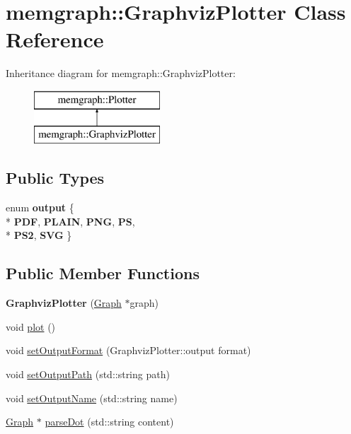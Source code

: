 \hypertarget{classmemgraph_1_1_graphviz_plotter}{}\section{memgraph\+:\+:Graphviz\+Plotter Class Reference}
\label{classmemgraph_1_1_graphviz_plotter}
Inheritance diagram for memgraph\+:\+:Graphviz\+Plotter\+:\begin{figure}[H]
\begin{center}
\leavevmode
\includegraphics[height=2.000000cm]{classmemgraph_1_1_graphviz_plotter}
\end{center}
\end{figure}
\subsection*{Public Types}
\begin{DoxyCompactItemize}
\item 
enum {\bfseries output} \{ \\*
{\bfseries P\+DF}, 
{\bfseries P\+L\+A\+IN}, 
{\bfseries P\+NG}, 
{\bfseries PS}, 
\\*
{\bfseries P\+S2}, 
{\bfseries S\+VG}
 \}\hypertarget{classmemgraph_1_1_graphviz_plotter_a0f8c41a31ef9efc836725e15a516db6e}{}\label{classmemgraph_1_1_graphviz_plotter_a0f8c41a31ef9efc836725e15a516db6e}

\end{DoxyCompactItemize}
\subsection*{Public Member Functions}
\begin{DoxyCompactItemize}
\item 
{\bfseries Graphviz\+Plotter} (\hyperlink{classmemgraph_1_1_graph}{Graph} $\ast$graph)\hypertarget{classmemgraph_1_1_graphviz_plotter_aa106e9d662602d4c9d45c74cf531f57c}{}\label{classmemgraph_1_1_graphviz_plotter_aa106e9d662602d4c9d45c74cf531f57c}

\item 
void \hyperlink{classmemgraph_1_1_graphviz_plotter_a51cc4c238a1808013fbe6ecdb2334afe}{plot} ()
\item 
void \hyperlink{classmemgraph_1_1_graphviz_plotter_a874449a89448c46f9333533c5f96e68e}{set\+Output\+Format} (Graphviz\+Plotter\+::output format)
\item 
void \hyperlink{classmemgraph_1_1_graphviz_plotter_a8d6fe8dc672a2982f7b2ad731ecbac64}{set\+Output\+Path} (std\+::string path)
\item 
void \hyperlink{classmemgraph_1_1_graphviz_plotter_ada06684b26c1c797307f10bc97924a11}{set\+Output\+Name} (std\+::string name)
\item 
\hyperlink{classmemgraph_1_1_graph}{Graph} $\ast$ \hyperlink{classmemgraph_1_1_graphviz_plotter_a15916025a114984477c1677dd360772a}{parse\+Dot} (std\+::string content)
\end{DoxyCompactItemize}
